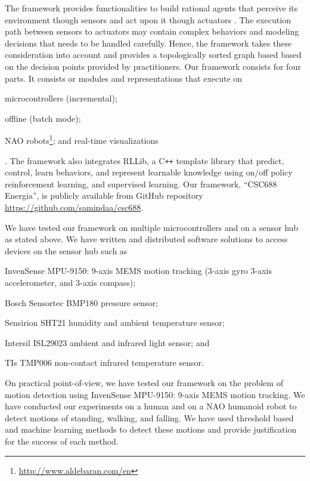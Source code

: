 \documentclass{llncs}
\begin{document}
\begin{sloppy}
The framework provides functionalities to build  rational agents that perceive its
environment though sensors and act upon it though actuators \cite{russel2009}. The execution path
between sensors to actuators may contain complex behaviors and modeling decisions that needs to be
handled carefully. Hence, the framework takes these consideration into account and provides a
topologically sorted graph based based on the decision points provided by practitioners. Our
framework consists for four parts. It consists or modules and representations that execute on
\begin{inparaenum}[(1)]\item microcontrollers (incremental); \item offline (batch mode); \item NAO
robots\footnote{\url{http://www.aldebaran.com/en}}; and real-time visualizations\end{inparaenum}. 
The framework also integrates RLLib, a C\texttt{++} template library that predict, control, learn
behaviors, and represent learnable knowledge using on/off policy reinforcement learning, and
supervised learning. Our framework, ``CSC688 Energia'', is publicly available from GitHub repository
\url{https://github.com/samindaa/csc688}.

We have tested our framework on multiple microcontrollers and on a sensor hub as stated above. We
have written and distributed software solutions to access devices on the sensor hub such as
\begin{inparaenum}[(1)] \item InvenSense MPU-9150: 9-axis MEMS motion tracking (3-axis gyro
3-axis accelerometer, and 3-axis compass); \item Bosch Sensortec BMP180 pressure sensor; \item
Sensirion SHT21 humidity and ambient temperature sensor; \item Intersil ISL29023 ambient and
infrared light sensor; and \item TIs TMP006 non-contact infrared temperature sensor.
\end{inparaenum}

On practical point-of-view, we have tested our framework on the problem of motion detection using
InvenSense MPU-9150: 9-axis MEMS motion tracking. We have conducted our experiments on a human
and on a NAO humanoid robot to detect motions of standing, walking, and falling. We have used
threshold based and machine learning methods to detect these motions and provide justification
for the success of each method.   



\end{sloppy}
\end{document}
